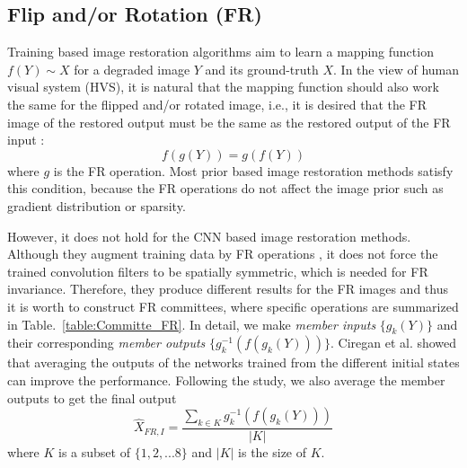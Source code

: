 \documentclass[journal]{IEEEtran}
\begin{document}
\subsection{Flip and/or Rotation (FR)}
Training based image restoration algorithms \cite{schmidt2014shrinkage,chen2016trainable,burger2012image,
zhang2016beyond,dong2016image} aim to learn a mapping function 
$f(Y)\sim X$ for a degraded image $Y$ and its ground-truth $X$. In the view of 
human visual system (HVS), it is natural that the mapping function should
also work the same for the flipped and/or rotated image, i.e., it is desired that the 
FR image of the restored output must be the same as the restored output of the 
FR input : 
\begin{equation}
f(g(Y)) = g(f(Y))
\label{eq:Committee_invariance}
\end{equation}
where $g$ is the FR operation. Most prior based image restoration
methods satisfy this condition, because the FR 
operations do not affect the image prior such as gradient distribution or 
sparsity.

However, it does not hold for the CNN based image restoration methods.
 Although they  augment training data by FR operations
\cite{zhang2016beyond, chen2016trainable}, it does not force 
the trained convolution filters to be spatially symmetric, which is needed for
FR invariance. Therefore, they produce different results for the FR images
and thus it is worth to construct FR committees, where specific
operations are summarized in Table.~\ref{table:Committe_FR}.
In detail, we make \textit{member inputs} $\{g_{k}(Y)\}$ and their 
corresponding \textit{member outputs} $\{g_{k}^{-1}(f(g_{k}(Y)))\}$. 
Ciregan et al. \cite{ciregan2012multi} showed that averaging the outputs 
of the networks trained from the different initial states can improve the 
performance. Following the study, we also average the member outputs 
to get the final output
\begin{equation}
\hat{X}_{FR, I} = \frac{\sum_{k\in K}g_{k}^{-1}(f(g_{k}(Y)))}{\left| K \right| }
\label{eq:Committee_FR_Result}
\end{equation}
where $K$ is a subset of $\{1, 2, ...8\}$ and $\left| K \right|$ is the size of $K$.
\end{document}
